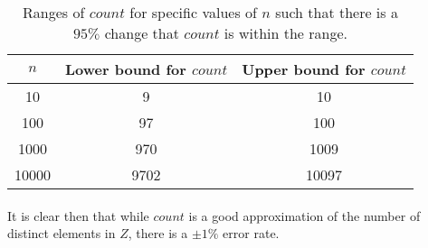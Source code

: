 \documentclass[../main.tex]{subfiles}
\begin{document}
\begin{table}[h!]
  \centering
  \begin{center}
  \begin{tabular}{| c | c | c |}
    \hline
    \(n\) & Lower bound for \(count\) & Upper bound for \(count\) \\ 
    \hline
    10 & 9 & 10 \\ 
    100 & 97 & 100 \\ 
    1000 & 970 & 1009 \\ 
    10000 & 9702 & 10097 \\ 
    \hline
  \end{tabular}
  \end{center}

\caption{Ranges of \(count\) for specific values of \(n\) such that there is a \(95\%\) change that \(count\) is within the range.}
\label{tab:ex1}
\end{table}

\paragraph{} It is clear then that while \(count\) is a good approximation of the number of distinct elements in \(Z\), there is a \(\pm 1\%\) error rate.
\end{document}
